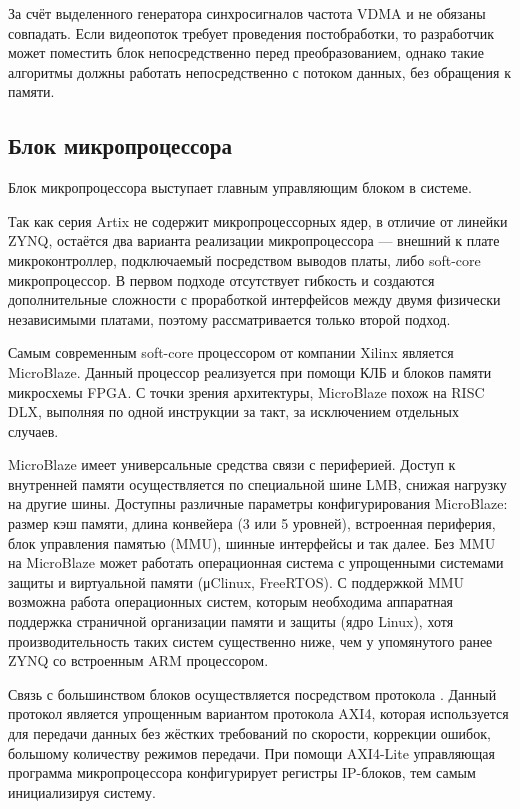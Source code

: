 За счёт выделенного генератора синхросигналов частота VDMA и  не обязаны совпадать.
Если видеопоток требует проведения постобработки, то разработчик может поместить блок непосредственно перед
преобразованием, однако такие алгоритмы должны работать непосредственно с потоком данных, без обращения к памяти.

\subsection{Блок микропроцессора}
\label{sec:structural:microprocessor}
Блок микропроцессора выступает главным управляющим блоком в системе.

Так как серия Artix не содержит микропроцессорных ядер, в отличие от линейки ZYNQ,
остаётся два варианта реализации микропроцессора --- внешний к плате микроконтроллер, подключаемый
посредством выводов платы, либо soft-core микропроцессор. В первом подходе отсутствует гибкость и создаются
дополнительные сложности с проработкой интерфейсов между двумя физически независимыми платами, поэтому
рассматривается только второй подход.

Самым современным soft-core процессором от компании Xilinx является MicroBlaze. Данный процессор реализуется
при помощи КЛБ и блоков памяти микросхемы FPGA. С точки зрения архитектуры, MicroBlaze похож на RISC DLX,
выполняя по одной инструкции за такт, за исключением отдельных случаев.

MicroBlaze имеет универсальные средства связи с периферией. Доступ к внутренней памяти осуществляется по специальной
шине LMB, снижая нагрузку на другие шины. Доступны различные параметры конфигурирования MicroBlaze:
размер кэш памяти, длина конвейера (3 или 5 уровней), встроенная периферия, блок управления памятью (MMU),
шинные интерфейсы и так далее. Без MMU на MicroBlaze может работать операционная система с упрощенными системами
защиты и виртуальной памяти (μClinux, FreeRTOS). С поддержкой MMU возможна работа операционных систем, которым необходима
аппаратная поддержка страничной организации памяти и защиты (ядро Linux), хотя производительность таких систем существенно ниже,
чем у упомянутого ранее ZYNQ со встроенным ARM процессором.

Связь с большинством блоков осуществляется посредством протокола . Данный протокол является упрощенным
вариантом протокола AXI4, которая используется для передачи данных без жёстких требований по скорости, коррекции ошибок,
большому количеству режимов передачи. При помощи AXI4-Lite управляющая программа микропроцессора конфигурирует регистры
IP-блоков, тем самым инициализируя систему.

